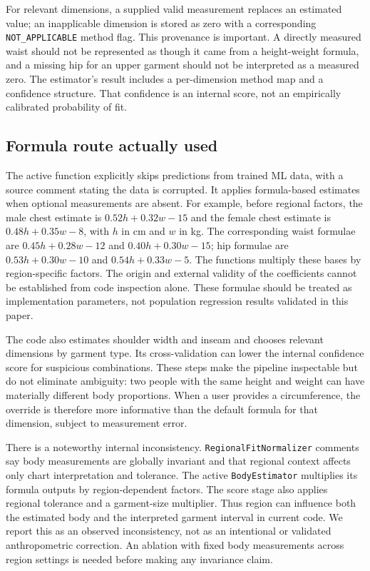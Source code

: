 \documentclass[11pt,a4paper]{article}
\begin{document}
For relevant dimensions, a supplied valid measurement replaces an estimated value; an inapplicable dimension is stored as zero with a corresponding \texttt{NOT\_APPLICABLE} method flag. This provenance is important. A directly measured waist should not be represented as though it came from a height-weight formula, and a missing hip for an upper garment should not be interpreted as a measured zero. The estimator's result includes a per-dimension method map and a confidence structure. That confidence is an internal score, not an empirically calibrated probability of fit.

\subsection{Formula route actually used}
The active function explicitly skips predictions from trained ML data, with a source comment stating the data is corrupted. It applies formula-based estimates when optional measurements are absent. For example, before regional factors, the male chest estimate is $0.52h+0.32w-15$ and the female chest estimate is $0.48h+0.35w-8$, with $h$ in cm and $w$ in kg. The corresponding waist formulae are $0.45h+0.28w-12$ and $0.40h+0.30w-15$; hip formulae are $0.53h+0.30w-10$ and $0.54h+0.33w-5$. The functions multiply these bases by region-specific factors. The origin and external validity of the coefficients cannot be established from code inspection alone. These formulae should be treated as implementation parameters, not population regression results validated in this paper.

The code also estimates shoulder width and inseam and chooses relevant dimensions by garment type. Its cross-validation can lower the internal confidence score for suspicious combinations. These steps make the pipeline inspectable but do not eliminate ambiguity: two people with the same height and weight can have materially different body proportions. When a user provides a circumference, the override is therefore more informative than the default formula for that dimension, subject to measurement error.

There is a noteworthy internal inconsistency. \texttt{RegionalFitNormalizer} comments say body measurements are globally invariant and that regional context affects only chart interpretation and tolerance. The active \texttt{BodyEstimator} multiplies its formula outputs by region-dependent factors. The score stage also applies regional tolerance and a garment-size multiplier. Thus region can influence both the estimated body and the interpreted garment interval in current code. We report this as an observed inconsistency, not as an intentional or validated anthropometric correction. An ablation with fixed body measurements across region settings is needed before making any invariance claim.
\end{document}
